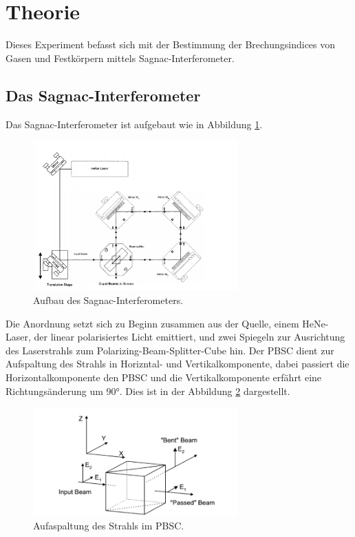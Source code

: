 \section{Theorie}
\label{sec:Theorie}
Dieses Experiment befasst sich mit der Bestimmung der Brechungsindices
von Gasen und Festkörpern mittels Sagnac-Interferometer.

\subsection{Das Sagnac-Interferometer}
Das Sagnac-Interferometer ist aufgebaut wie in Abbildung \ref{fig:apparat}.
\begin{figure}
    \centering
    \includegraphics[width=0.7\textwidth]{Apparatur.PNG}
    \caption{Aufbau des Sagnac-Interferometers.\cite{skript}}
    \label{fig:apparat}
\end{figure}
\FloatBarrier
Die Anordnung setzt sich zu Beginn zusammen aus der Quelle, einem HeNe-Laser, der linear polarisiertes Licht emittiert, und zwei
Spiegeln zur Ausrichtung des Laserstrahls zum Polarizing-Beam-Splitter-Cube hin.
Der PBSC dient zur Aufspaltung des Strahls in Horizntal- und Vertikalkomponente,
dabei passiert die Horizontalkomponente den PBSC und die Vertikalkomponente
erfährt eine Richtungsänderung um $90\si{\degree}$. Dies ist in der Abbildung
\ref{fig:pbsc} dargestellt.
\begin{figure}
   \centering
   \includegraphics[width=0.7\textwidth]{Pbsc.PNG}
   \caption{Aufaspaltung des Strahls im PBSC.\cite{skript}}
   \label{fig:pbsc}
\end{figure}

